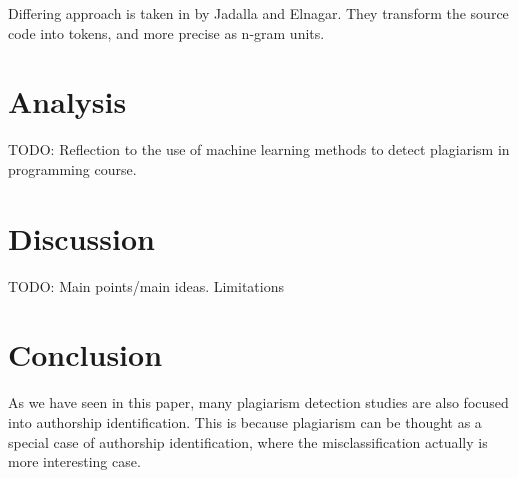 \documentclass[english]{tktltiki2}
\theoremstyle{definition}
\theoremstyle{remark}
\begin{document}
Differing approach is taken in \cite{jadalla2008pde4java} by Jadalla and Elnagar. They transform the source code into tokens, and more precise as n-gram units. 





\section{Analysis}
TODO: Reflection to the use of machine learning methods to detect plagiarism in programming course.


\section{Discussion}

TODO: Main points/main ideas. Limitations

\section{Conclusion}

As we have seen in this paper, many plagiarism detection studies are also focused into authorship identification. This is because plagiarism can be thought as a special case of authorship identification, where the misclassification actually is more interesting case. 


%
%
%
%







% 
\end{document}
